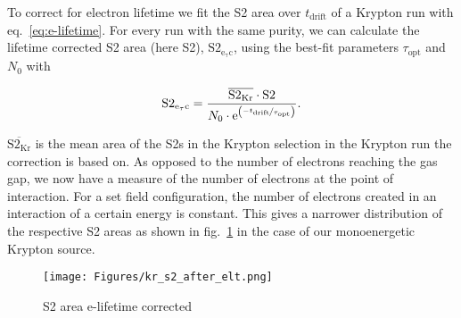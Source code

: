 To correct for electron lifetime we fit the S2 area over $ t_\mathrm{drift} $ of a Krypton run with eq.~\ref{eq:e-lifetime}.
For every run with the same purity, we can calculate the lifetime corrected S2 area (here S2), $ \mathrm{S2_\mathrm{e_\tau c}} $, using the best-fit parameters $ \tau_\mathrm{opt} $ and $ N_0 $ with

\begin{equation}
    \mathrm{S2_\mathrm{e_\tau c}} = \frac{ \overline{\mathrm{S2_{Kr}}} \cdot \mathrm{S2} }{ N_0 \cdot \mathrm{e}^{ \left( \nicefrac{-t_\mathrm{drift}}{\tau_\mathrm{opt}} \right)} }.  %
\end{equation}

$ \overline{\mathrm{S2_{Kr}}} $ is the mean area of the S2s in the Krypton selection in the Krypton run the correction is based on.
As opposed to the number of electrons reaching the gas gap, we now have a measure of the number of electrons at the point of interaction.
For a set field configuration, the number of electrons created in an interaction of a certain energy is constant.
This gives a narrower distribution of the respective S2 areas as shown in fig.~\ref{fig:s2-area-hist-after-eltc} in the case of our monoenergetic Krypton source.


\begin{figure}
    \centering
    \texttt{[image: Figures/kr\_s2\_after\_elt.png]}  %
    \caption[S2 area e-lifetime corrected]{
        S2 area e-lifetime corrected
    }
    \label{fig:s2-area-hist-after-eltc}
\end{figure}


